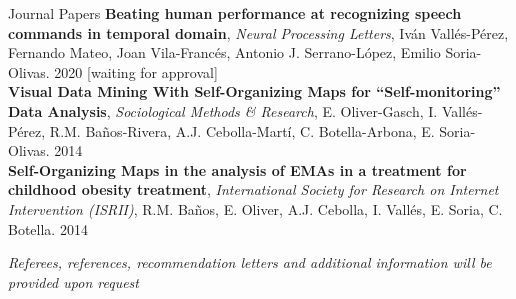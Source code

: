 \documentclass{resume} %
\begin{document}
\begin{rSection}{Journal Papers}
{\textbf{Beating human performance at recognizing speech commands in temporal domain}, \textit{Neural Processing Letters}, Iván Vallés-Pérez, Fernando Mateo, Joan Vila-Francés, Antonio J. Serrano-López, Emilio Soria-Olivas. \hfill {2020} [waiting for approval]}\\
{\textbf{Visual Data Mining With Self-Organizing Maps for ``Self-monitoring'' Data Analysis}, \textit{Sociological Methods \& Research}, E. Oliver-Gasch, I. Vallés-Pérez, R.M. Baños-Rivera, A.J. Cebolla-Martí, C. Botella-Arbona, E. Soria-Olivas. \hfill {2014}}\\
{\textbf{Self-Organizing Maps in the analysis of EMAs in a treatment for childhood obesity treatment}, \textit{International Society for Research on Internet Intervention (ISRII)}, R.M. Baños, E. Oliver, A.J. Cebolla, I. Vallés, E. Soria, C. Botella.  \hfill {2014}}

\end{rSection}


\begin{flushright}
	\small{\textit{Referees, references, recommendation letters and additional information will be provided upon request}}
\end{flushright}
\end{document}
